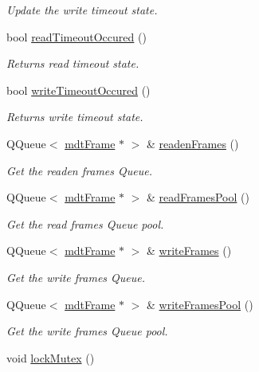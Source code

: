 \begin{DoxyCompactItemize}
\begin{DoxyCompactList}\small\item\em Update the write timeout state. \end{DoxyCompactList}\item 
bool \hyperlink{classmdt_abstract_port_aec94143165e486cbbe6e0979be887c7e}{readTimeoutOccured} ()
\begin{DoxyCompactList}\small\item\em Returns read timeout state. \end{DoxyCompactList}\item 
bool \hyperlink{classmdt_abstract_port_a7c05a1abe77f0c3c334016c6ad866f67}{writeTimeoutOccured} ()
\begin{DoxyCompactList}\small\item\em Returns write timeout state. \end{DoxyCompactList}\item 
QQueue$<$ \hyperlink{classmdt_frame}{mdtFrame} $\ast$ $>$ \& \hyperlink{classmdt_abstract_port_a05356a33dc546a11d2794a0419d749e0}{readenFrames} ()
\begin{DoxyCompactList}\small\item\em Get the readen frames Queue. \end{DoxyCompactList}\item 
QQueue$<$ \hyperlink{classmdt_frame}{mdtFrame} $\ast$ $>$ \& \hyperlink{classmdt_abstract_port_a3850ab819a8fc5dad22af14b74c45274}{readFramesPool} ()
\begin{DoxyCompactList}\small\item\em Get the read frames Queue pool. \end{DoxyCompactList}\item 
QQueue$<$ \hyperlink{classmdt_frame}{mdtFrame} $\ast$ $>$ \& \hyperlink{classmdt_abstract_port_a4fed10be147dfce6ca315467ff3fb968}{writeFrames} ()
\begin{DoxyCompactList}\small\item\em Get the write frames Queue. \end{DoxyCompactList}\item 
QQueue$<$ \hyperlink{classmdt_frame}{mdtFrame} $\ast$ $>$ \& \hyperlink{classmdt_abstract_port_abf093b67fddebffa4f3c52277b9a8cf7}{writeFramesPool} ()
\begin{DoxyCompactList}\small\item\em Get the write frames Queue pool. \end{DoxyCompactList}\item 
\hypertarget{classmdt_abstract_port_a6bf2ecdcf894da3929a22eb8793a9fe3}{
void \hyperlink{classmdt_abstract_port_a6bf2ecdcf894da3929a22eb8793a9fe3}{lockMutex} ()}
\label{classmdt_abstract_port_a6bf2ecdcf894da3929a22eb8793a9fe3}


\end{DoxyCompactItemize}
